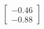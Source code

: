 \documentclass[preview]{standalone}
\begin{document}
\begin{align*}
\begin{bmatrix} -0.46 \\ -0.88 \end{bmatrix}
\end{align*}
\end{document}
